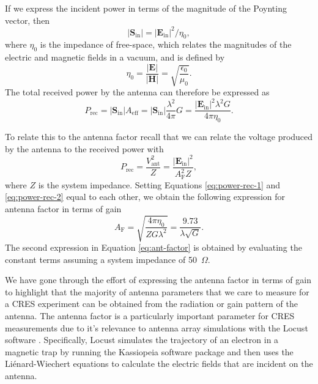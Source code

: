 If we express the incident power in terms of the magnitude of the Poynting vector, then
\begin{equation}
    |\mathbf{S}_\mathrm{in}|=|\mathbf{E}_\mathrm{in}|^2/\eta_0,
\end{equation}
where $\eta_0$ is the impedance of free-space, which relates the magnitudes of the electric and magnetic fields in a vacuum, and is defined by
\begin{equation}
    \eta_0 = \frac{|\mathbf{E}|}{|\mathbf{H}|} = \sqrt{\frac{\epsilon_0}{\mu_0}}.
\end{equation}
The total received power by the antenna can therefore be expressed as
\begin{equation}
    P_\mathrm{rec}=|\mathbf{S}_\mathrm{in}|A_\mathrm{eff}=|\mathbf{S}_\mathrm{in}|\frac{\lambda^2}{4\pi}G=\frac{|\mathbf{E}_\mathrm{in}|^2\lambda^2G}{4\pi\eta_0}.
    \label{eq:power-rec-1}
\end{equation}

To relate this to the antenna factor recall that we can relate the voltage produced by the antenna to the received power with
\begin{equation}
    P_\mathrm{rec}=\frac{V_\mathrm{ant}^2}{Z}=\frac{|\mathbf{E}_\mathrm{in}|^2}{A_\mathrm{F}^2Z},
    \label{eq:power-rec-2}
\end{equation}
where $Z$ is the system impedance. Setting Equations \ref{eq:power-rec-1} and \ref{eq:power-rec-2} equal to each other, we obtain the following expression for antenna factor in terms of gain
\begin{equation}
    A_\mathrm{F} = \sqrt{\frac{4\pi\eta_0}{ZG\lambda^2}}=\frac{9.73}{\lambda\sqrt{G}}.
    \label{eq:ant-factor}
\end{equation}
The second expression in Equation \ref{eq:ant-factor} is obtained by evaluating the constant terms assuming a system impedance of 50~$\Omega$.

We have gone through the effort of expressing the antenna factor in terms of gain to highlight that the majority of antenna parameters that we care to measure for a CRES experiment can be obtained from the radiation or gain pattern of the antenna. The antenna factor is a particularly important parameter for CRES measurements due to it's relevance to antenna array simulations with the Locust software \cite{p8locustpaper, nb_thesis}. Specifically, Locust simulates the trajectory of an electron in a magnetic trap by running the Kassiopeia software package \cite{kassiopeia} and then uses the Li\'{e}nard-Wiechert equations \cite{lw_potential_1, lw_potential_2} to calculate the electric fields that are incident on the antenna. 

